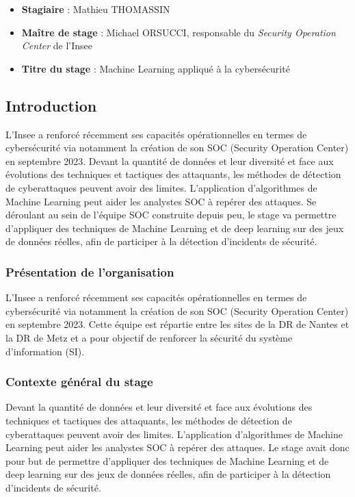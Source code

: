 \documentclass[
  letterpaper,
  DIV=11,
  numbers=noendperiod]{scrartcl}
\providecommand{\tightlist}{%
  \setlength{\itemsep}{0pt}\setlength{\parskip}{0pt}}\usepackage{longtable,booktabs,array}
\begin{document}
\begin{itemize}
\tightlist
\item
  \textbf{Stagiaire} : Mathieu THOMASSIN
\item
  \textbf{Maître de stage} : Michael ORSUCCI, responsable du
  \emph{Security Operation Center} de l'Insee
\item
  \textbf{Titre du stage} : Machine Learning appliqué à la cybersécurité
\end{itemize}

\subsection{Introduction}\label{introduction}

L'Insee a renforcé récemment ses capacités opérationnelles en termes de
cybersécurité via notamment la création de son SOC (Security Operation
Center) en septembre 2023. Devant la quantité de données et leur
diversité et face aux évolutions des techniques et tactiques des
attaquants, les méthodes de détection de cyberattaques peuvent avoir des
limites. L'application d'algorithmes de Machine Learning peut aider les
analystes SOC à repérer des attaques. Se déroulant au sein de l'équipe
SOC construite depuis peu, le stage va permettre d'appliquer des
techniques de Machine Learning et de deep learning sur des jeux de
données réelles, afin de participer à la détection d'incidents de
sécurité.

\subsubsection{Présentation de
l'organisation}\label{pruxe9sentation-de-lorganisation}

L'Insee a renforcé récemment ses capacités opérationnelles en termes de
cybersécurité via notamment la création de son SOC (Security Operation
Center) en septembre 2023. Cette équipe est répartie entre les sites de
la DR de Nantes et la DR de Metz et a pour objectif de renforcer la
sécurité du système d'information (SI).

\subsubsection{Contexte général du
stage}\label{contexte-guxe9nuxe9ral-du-stage}

Devant la quantité de données et leur diversité et face aux évolutions
des techniques et tactiques des attaquants, les méthodes de détection de
cyberattaques peuvent avoir des limites. L'application d'algorithmes de
Machine Learning peut aider les analystes SOC à repérer des attaques. Le
stage avait donc pour but de permettre d'appliquer des techniques de
Machine Learning et de deep learning sur des jeux de données réelles,
afin de participer à la détection d'incidents de sécurité.
\end{document}
